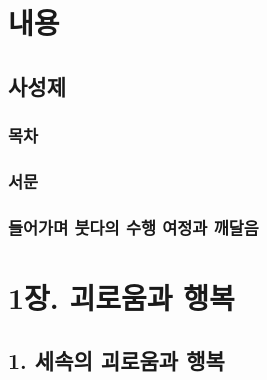 \documentclass[12pt, a4paper, oneside]{book}
\begin{document}
\part{내용}


	\newpage
	\chapter{사성제 }


		\newpage
		\minitoc				%



	\newpage  \null
	\section{목차}

	\newpage  \null
	\section{서문}

	\newpage  \null
	\section{들어가며  붓다의 수행 여정과 깨달음}


	\part{1장. 괴로움과 행복}

	\newpage

	\chapter{1. 세속의 괴로움과 행복}
		\newpage
		\minitoc				%
\end{document}
